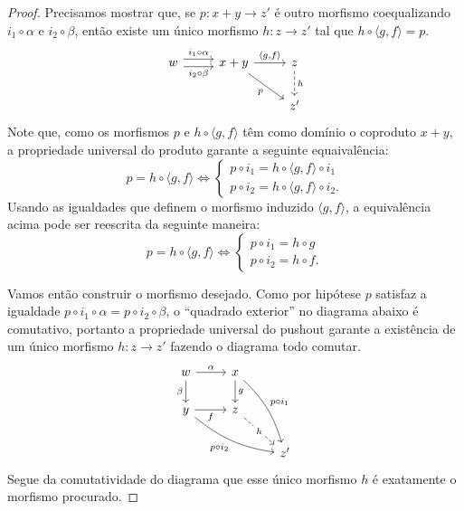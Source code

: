 \begin{proof}
    Precisamos mostrar que, se $p: x+y \to z'$ é outro morfismo coequalizando $i_1 \circ \alpha$ e $i_2 \circ \beta$, então existe um único morfismo $h: z \to z'$ tal que $h \circ \langle g,f \rangle = p$.
    \begin{displaymath}
        \begin{tikzcd}
            w
            \arrow[r, shift left=1.25, "i_1 \circ \alpha"]
            \arrow[r, shift right=1.25, "i_2 \circ \beta" swap]
            & x+y
            \arrow[r, "{\langle g,f \rangle}"]
            \arrow[rd, "p" swap]
            & z
            \arrow[d, dashed, "h"]
            \\ & & z'
        \end{tikzcd}
    \end{displaymath}
    Note que, como os morfismos $p$ e $h \circ \langle g,f \rangle$ têm como domínio o coproduto $x+y$, a propriedade universal do produto garante a seguinte equaivalência:
    \begin{displaymath}
        p = h \circ \langle g,f \rangle
        \iff
        \begin{cases}
            p \circ i_1 = h \circ \langle g,f \rangle \circ i_1 \\
            p \circ i_2 = h \circ \langle g,f \rangle \circ i_2.
        \end{cases}
    \end{displaymath}
    Usando as igualdades que definem o morfismo induzido $\langle g,f \rangle$, a equivalência acima pode ser reescrita da seguinte maneira:
    \begin{displaymath}
        p = h \circ \langle g,f \rangle \iff
        \begin{cases}
            p \circ i_1 = h \circ g \\
            p \circ i_2 = h \circ f.
        \end{cases}
    \end{displaymath}
    
    
    Vamos então construir o morfismo desejado.
    Como por hipótese $p$ satisfaz a igualdade $p \circ i_1 \circ \alpha = p \circ i_2 \circ \beta$, o ``quadrado exterior'' no diagrama abaixo é comutativo, portanto a propriedade universal do pushout garante a existência de um único morfismo $h: z \to z'$ fazendo o diagrama todo comutar.
    \begin{displaymath}
        \begin{tikzcd}
            w
            \arrow[r, "\alpha"]
            \arrow[d, "\beta" swap]
            & x
            \arrow[d, "g"]
            \arrow[rdd, bend left=15, "p \circ i_1"]
            \\ y
            \arrow[r, "f" swap]
            \arrow[rrd, bend right=15, "p \circ i_2" swap]
            & z
            \arrow[rd, dashed, "h" description]
            \\ & & z'
        \end{tikzcd}
    \end{displaymath}
    Segue da comutatividade do diagrama que esse único morfismo $h$ é exatamente o morfismo procurado.


\end{proof}
